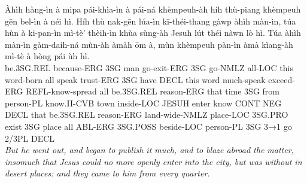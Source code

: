 \documentclass[11pt,a4paper]{article}
\begin{document}
\begin{exe}
\gll Àhìh hàng-ìn à mipa pái-khìa-ìn à pái-ná khèmpeuh-àh híh thù-piang khèmpeuh gēn bel-ìn à néi hì. Híh thù nak-gēn lúa-ìn kī-théi-thang gàwp àhìh màn-ìn, túa hùn à ki-pan-ìn mì-tè' thèih-ìn khùa sùng-àh Jesuh lút théi nàwn lò hì. Túa àhìh màn-ìn gàm-daih-ná mùn-àh àmàh ōm à, mùn khèmpeuh pàn-ìn àmà kìang-àh mì-tè à hòng pái ùh hì. \\
     be.3SG.REL because-ERG 3SG man go-exit-ERG 3SG go-NMLZ all-LOC this word-born all speak trust-ERG 3SG have DECL this word much-speak exceed-ERG REFL-know-spread all be.3SG.REL reason-ERG that time 3SG from person-PL know.II-CVB town inside-LOC JESUH enter know CONT NEG DECL that be.3SG.REL reason-ERG land-wide-NMLZ place-LOC 3SG.PRO exist 3SG place all ABL-ERG 3SG.POSS beside-LOC person-PL 3SG 3→1 go 2/3PL DECL \\
\glt \textcolor{kjvcolor}{\textit{But he went out, and began to publish it much, and to blaze abroad the matter, insomuch that Jesus could no more openly enter into the city, but was without in desert places: and they came to him from every quarter.}}

\end{exe}
\newpage
\end{document}
